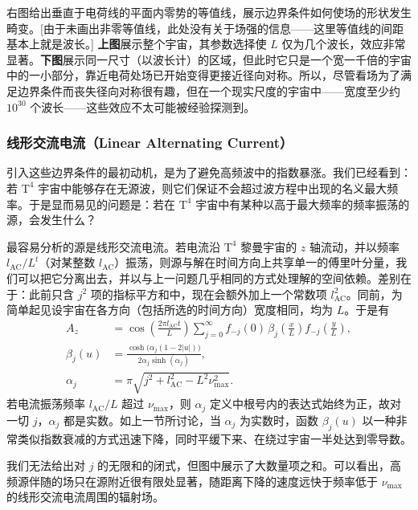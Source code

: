 右图给出垂直于电荷线的平面内零势的等值线，展示边界条件如何使场的形状发生畸变。[由于未画出非零等值线，此处没有关于场强的信息——这里等值线的间距基本上就是波长。] \textbf{上图}展示整个宇宙，其参数选择使 $L$ 仅为几个波长，效应非常显著。\textbf{下图}展示同一尺寸（以波长计）的区域，但此时它只是一个宽一千倍的宇宙中的一小部分，靠近电荷处场已开始变得更接近径向对称。所以，尽管看场为了满足边界条件而丧失径向对称很有趣，但在一个现实尺度的宇宙中——宽度至少约 $10^{30}$ 个波长——这些效应不太可能被经验探测到。

\subsubsection{线形交流电流（Linear Alternating Current）}

引入这些边界条件的最初动机，是为了避免高频波中的指数暴涨。我们已经看到：若 $\text{T}^{4}$ 宇宙中能够存在无源波，则它们保证不会超过波方程中出现的名义最大频率。于是显而易见的问题是：若在 $\text{T}^{4}$ 宇宙中有某种以高于最大频率的频率振荡的源，会发生什么？


最容易分析的源是线形交流电流。若电流沿 $\text{T}^{4}$ 黎曼宇宙的 $z$ 轴流动，并以频率 $l_{\text{AC}}/L^{t}$（对某整数 $l_{\text{AC}}$）振荡，则源与解在时间方向上共享单一的傅里叶分量，我们可以把它分离出去，并以与上一问题几乎相同的方式处理解的空间依赖。差别在于：此前只含 $j^{2}$ 项的指标平方和中，现在会额外加上一个常数项 $l_{\text{AC}}^{2}$。同前，为简单起见设宇宙在各方向（包括所选的时间方向）宽度相同，均为 $L$。于是有
\begin{align}
A_{z} &= \cos\!\left(\frac{2\pi l_{\text{AC}} t}{L}\right)\sum_{j=0}^{\infty} f_{-j}(0)\,\beta_{j}\!\left(\frac{x}{L}\right) f_{-j}\!\left(\frac{y}{L}\right),\\
\beta_{j}(u) &= \frac{\cosh\!\bigl(\alpha_{j}(1-2|u|)\bigr)}{2\alpha_{j}\sinh(\alpha_{j})},\\
\alpha_{j} &= \pi\sqrt{j^{2}+l_{\text{AC}}^{2}-L^{2}\nu_{\max}^{2}}.
\end{align}
若电流振荡频率 $l_{\text{AC}}/L$ 超过 $\nu_{\max}$，则 $\alpha_{j}$ 定义中根号内的表达式始终为正，故对一切 $j$，$\alpha_{j}$ 都是实数。如上一节所讨论，当 $\alpha_{j}$ 为实数时，函数 $\beta_{j}(u)$ 以一种非常类似指数衰减的方式迅速下降，同时平缓下来、在绕过宇宙一半处达到零导数。

我们无法给出对 $j$ 的无限和的闭式，但图中展示了大数量项之和。可以看出，高频源伴随的场只在源附近很有限处显著，随距离下降的速度远快于频率低于 $\nu_{\max}$ 的线形交流电流周围的辐射场。

